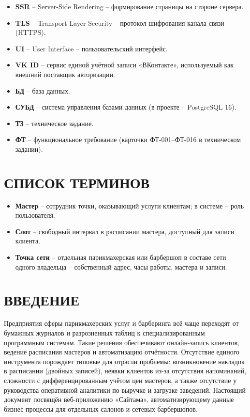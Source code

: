 \begin{itemize}[leftmargin=0pt, itemindent=1.5cm, labelsep=0pt, label={}]
  СУБД.
\item \textbf{SSR} -- Server-Side Rendering -- формирование страницы на стороне
  сервера.
\item \textbf{TLS} -- Transport Layer Security -- протокол шифрования канала связи
  (HTTPS).
\item \textbf{UI} -- User Interface -- пользовательский интерфейс.
\item \textbf{VK ID} -- сервис единой учётной записи «ВКонтакте», используемый как
  внешний поставщик авторизации.
\item \textbf{БД} -- база данных.
\item \textbf{СУБД} -- система управления базами данных (в проекте -- PostgreSQL 16).
\item \textbf{ТЗ} -- техническое задание.
\item \textbf{ФТ} -- функциональное требование (карточки ФТ-001--ФТ-016 в
  техническом задании).
\end{itemize}

\section*{\hspace*{\gostindent}СПИСОК ТЕРМИНОВ}

\begin{itemize}[leftmargin=0pt, itemindent=1.5cm, labelsep=0pt, label={}]
\item \textbf{Мастер} -- сотрудник точки, оказывающий услуги клиентам; в системе --
  роль пользователя.
\item \textbf{Слот} -- свободный интервал в расписании мастера, доступный для
  записи клиента.
\item \textbf{Точка сети} -- отдельная парикмахерская или барбершоп в составе сети
  одного владельца -- собственный адрес, часы работы, мастера и записи.
\end{itemize}

\section*{\hspace*{\gostindent}ВВЕДЕНИЕ}

Предприятия сферы парикмахерских услуг и барберинга всё чаще переходят
от бумажных журналов и разрозненных таблиц к специализированным
программным системам. Такие решения обеспечивают онлайн-запись
клиентов, ведение расписания мастеров и автоматизацию отчётности.
Отсутствие единого инструмента порождает типовые для отрасли проблемы:
возникновение накладок в расписании (двойных записей), неявки клиентов
из-за отсутствия напоминаний, сложности с дифференцированным учётом цен
мастеров, а также отсутствие у руководства оперативной аналитики по
выручке и загрузке заведений. Настоящий документ посвящён
веб-приложению «Сайтама», автоматизирующему данные бизнес-процессы для
отдельных салонов и сетевых барбершопов.

